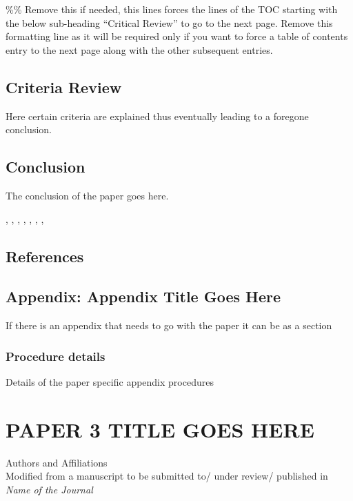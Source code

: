 \documentclass[
  12pt,
  notitlepage]{isuthesis}
\begin{document}

\%\% Remove this if needed, this lines forces the lines of the TOC starting with the below sub-heading ``Critical Review'' to go to the next page. Remove this formatting line as it will be required only if you want to force a table of contents entry to the next page along with the other subsequent entries.

\section{Criteria Review}

Here certain criteria are explained thus eventually
leading to a foregone conclusion.

\section{Conclusion}\label{Conclusion1}

The conclusion of the paper goes here.

\cite{allen}, \cite{bruner},
\cite{Hal82},
\cite{Rud73}, \cite{Con90},
\cite{Con78}, \cite{KR83},
\cite{KR86}

\section{References}
\printbibliography[heading=none, section=3]

\section{Appendix: Appendix Title Goes Here}

If there is an appendix that needs to go with the paper it can be as a section \cite{Aup91}

\subsection{Procedure details}

Details of the paper specific appendix procedures

\endrefsection

\chapter{PAPER 3 TITLE GOES HERE}

\begin{center}
    Authors and Affiliations \\
    Modified from a manuscript to be submitted to/ under review/ published in \textit{Name of the Journal} 
\end{center}
\end{document}
